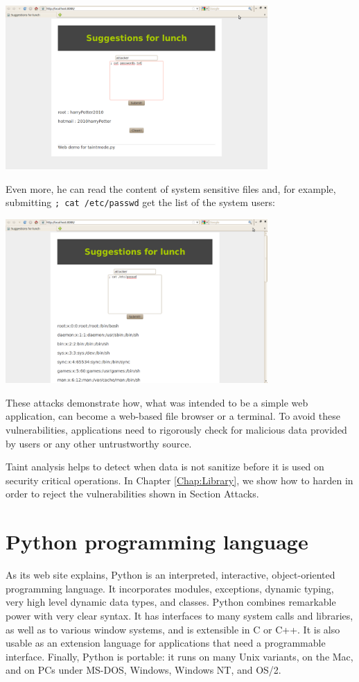 \includegraphics[width=100mm]{lunch5.png}

Even more, he can read the content of system sensitive files and,
for example, submitting \texttt{; cat /etc/passwd} get the list
of the system users:

\includegraphics[width=100mm]{lunch6.png}


These attacks demonstrate how, 
what was intended to be a simple web application,  
can become a web-based file browser or a terminal. To avoid 
these vulnerabilities, applications need to rigorously check 
for malicious data provided by users or any other 
untrustworthy source. 

Taint analysis helps to detect when 
data is not sanitize before it is used on security critical 
operations. In Chapter \ref{Chap:Library}, we show how to harden 
\suggestions in order to reject the vulnerabilities 
shown in Section Attacks.

\section{Python programming language}

As its web site explains\cite{Python},
Python is an interpreted, interactive, object-oriented programming language.
It incorporates modules, exceptions, dynamic typing, 
very high level dynamic data types, and classes. 
Python combines remarkable power with very clear syntax. 
It has interfaces to many system calls and libraries, as well 
as to various window systems, and is extensible in C or C++. 
It is also usable as an extension language for applications that 
need a programmable interface. Finally, Python is portable: it 
runs on many Unix variants, on the Mac, and on PCs under 
MS-DOS, Windows, Windows NT, and OS/2.

